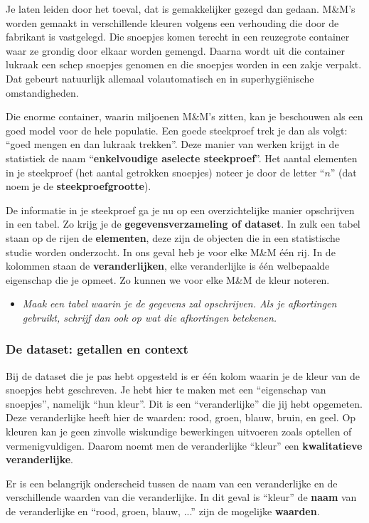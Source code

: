 \documentclass[11pt]{article}
\newcommand{\vraag}[2]{\begin{itemize}\item {\it #1} \vspace*{#2}\end{itemize}}
\begin{document}
Je laten leiden door het toeval, dat is gemakkelijker gezegd dan gedaan. M\&M's worden gemaakt in verschillende
kleuren volgens een verhouding die door de fabrikant is vastgelegd. Die snoepjes komen terecht in
een reuzegrote container waar ze grondig door elkaar worden gemengd. Daarna wordt uit die
container lukraak een schep snoepjes genomen en die snoepjes worden in een zakje verpakt. Dat
gebeurt natuurlijk allemaal volautomatisch en in superhygiënische omstandigheden.

Die enorme container, waarin miljoenen M\&M’s zitten, kan je beschouwen als een goed model voor
de hele populatie. Een goede steekproef trek je dan als volgt: “goed mengen en dan lukraak trekken”.
Deze manier van werken krijgt in de statistiek de naam “{\bf enkelvoudige aselecte steekproef}”. Het
aantal elementen in je steekproef (het aantal getrokken snoepjes) noteer je door de letter “$n$” (dat
noem je de {\bf steekproefgrootte}).

De informatie in je steekproef ga je nu op een overzichtelijke manier opschrijven in een tabel. Zo krijg je de
{\bf gegevensverzameling of dataset}. In zulk een tabel staan op de rijen de {\bf elementen}, deze zijn de objecten die in een statistische studie worden onderzocht. In ons geval heb je voor elke M\&M één rij. In de kolommen staan de {\bf veranderlijken}, elke veranderlijke is één welbepaalde eigenschap die je opmeet. Zo kunnen we voor elke M\&M de kleur noteren.

\vraag{Maak een tabel waarin je de gegevens zal opschrijven. Als je afkortingen gebruikt, schrijf dan ook op wat die afkortingen betekenen.}{10cm}

\subsubsection{De dataset: getallen en context}
Bij de dataset die je pas hebt opgesteld is er één kolom waarin je de kleur van de snoepjes hebt
geschreven. Je hebt hier te maken met een “eigenschap van snoepjes”, namelijk “hun kleur”. Dit is
een “veranderlijke” die jij hebt opgemeten. Deze veranderlijke heeft hier de waarden: rood, groen,
blauw, bruin, en geel.
Op kleuren kan je geen zinvolle wiskundige bewerkingen uitvoeren zoals optellen of
vermenigvuldigen. Daarom noemt men de veranderlijke “kleur” een {\bf kwalitatieve veranderlijke}.

Er is een belangrijk onderscheid tussen de naam van een veranderlijke en de
verschillende waarden van die veranderlijke.
In dit geval is “kleur” de {\bf naam} van de veranderlijke en “rood, groen, blauw,
...” zijn de mogelijke {\bf waarden}.
\end{document}
